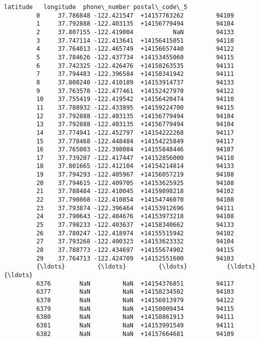 \documentclass[11pt]{article}
\begin{document}
\begin{Verbatim}[commandchars=\\\{\}]
                latitude   longitude  phone\_number postal\_code\_5  
         0     37.786848 -122.421547  +14157763262         94109  
         1     37.792888 -122.403135  +14156779494         94104  
         2     37.807155 -122.419004           NaN         94133  
         3     37.747114 -122.413641  +14156415051         94110  
         4     37.764013 -122.465749  +14156657440         94122  
         5     37.784626 -122.437734  +14153455060         94115  
         6     37.742325 -122.426476  +14158263535         94131  
         7     37.794483 -122.396584  +14158341942         94111  
         8     37.808240 -122.410189  +14153914737         94133  
         9     37.763578 -122.477461  +14152427970         94122  
         10    37.755419 -122.419542  +14156420474         94110  
         11    37.788932 -122.433895  +14159224700         94115  
         12    37.792888 -122.403135  +14156779494         94104  
         13    37.792888 -122.403135  +14156779494         94104  
         14    37.774941 -122.452797  +14154222268         94117  
         15    37.778468 -122.448484  +14154225849         94117  
         16    37.765003 -122.398084  +14155848446         94107  
         17    37.739207 -122.417447  +14152856000         94110  
         18    37.801665 -122.412104  +14154214814         94133  
         19    37.794293 -122.405967  +14156057219         94108  
         20    37.794615 -122.409705  +14153625925         94108  
         21    37.788484 -122.410045  +14159898218         94102  
         22    37.790868 -122.410854  +14154746070         94108  
         23    37.793874 -122.396464  +14153912696         94111  
         24    37.790643 -122.404676  +14153973218         94108  
         25    37.798233 -122.403637  +14158340662         94133  
         26    37.780247 -122.418974  +14155515942         94102  
         27    37.793268 -122.400323  +14153623332         94104  
         28    37.788773 -122.434697  +14155674902         94115  
         29    37.764713 -122.424709  +14152551600         94103  
         {\ldots}         {\ldots}         {\ldots}           {\ldots}           {\ldots}  
         6376        NaN         NaN  +14154376851         94117  
         6377        NaN         NaN  +14158234502         94103  
         6378        NaN         NaN  +14156013979         94122  
         6379        NaN         NaN  +14150009434         94115  
         6380        NaN         NaN  +14158861913         94111  
         6381        NaN         NaN  +14153991549         94111  
         6382        NaN         NaN  +14157664681         94109  

\end{Verbatim}
\end{document}
